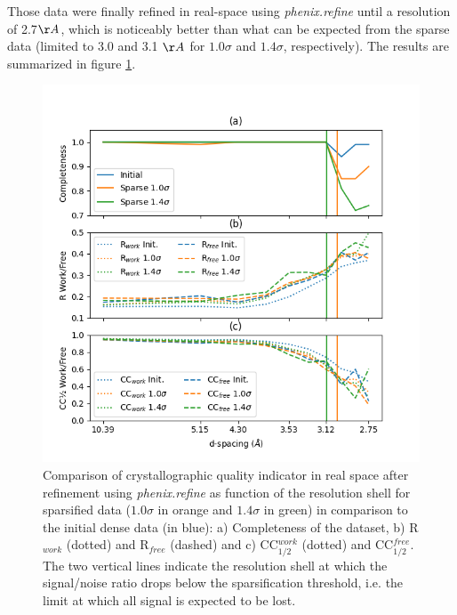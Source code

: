 \documentclass[preprint]{iucr}              %
\begin{document}
Those data were finally refined in real-space using \textit{phenix.refine} \cite{phenix} until a resolution of 2.7$\AA$, which is noticeably better than what can be expected from the sparse data (limited to 3.0 and 3.1 $\AA$ for $1.0\sigma$ and $1.4\sigma$, respectively). 
The results are summarized in figure \ref{r-NQO1}.

\begin{figure}
\label{r-NQO1}
\includegraphics[width=12cm]{NQO1/NQO1_refine}
\caption{Comparison of crystallographic quality indicator in real space after refinement using \textit{phenix.refine} as function of the resolution shell for sparsified data ($1.0\sigma$ in orange and $1.4\sigma$ in green) in comparison to the initial dense data (in blue):
a) Completeness of the dataset, b) R$_{work}$ (dotted) and R$_{free}$ (dashed) and c) CC$_{1/2}^{work}$ (dotted) and CC$_{1/2}^{free}$.
The two vertical lines indicate the resolution shell at which the signal/noise ratio drops below the sparsification threshold, i.e. the limit at which all signal is expected to be lost.}
\end{figure}
\end{document}
